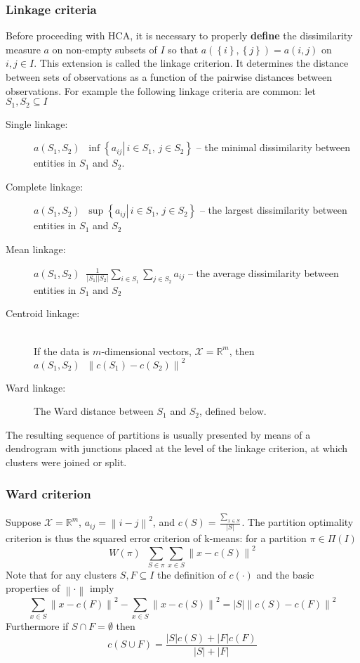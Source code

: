 \documentclass[a4paper]{article}
\newcommand{\obj}[1]{{\left\{ #1 \right \}}}
\newcommand{\brac}[1]{{\left ( #1 \right )}}
\newcommand{\induc}[1]{{\left . #1 \right \vert}}
\newcommand{\abs}[1]{{\left | #1 \right |}}
\newcommand{\nrm}[1]{{\left\| #1 \right \|}}
\newcommand{\Real}{\mathbb{R}}
\newcommand{\defn}{\mathop{\overset{\Delta}{=}}\nolimits}
\begin{document}
\subsubsection*{Linkage criteria} %
\label{ssub:linkage_criteria}

Before proceeding with HCA, it is necessary to properly \textbf{define} the dissimilarity measure $a$ on non-empty subsets of $I$ so that $a\brac{\obj{i}, \obj{j}} = a(i,j)$ on $i,j\in I$. This extension is called the linkage criterion. It determines the distance between sets of observations as a function of the pairwise distances between observations. For example the following linkage criteria are common: let $S_1, S_2\subseteq I$ \begin{description}
	\item[Single linkage:] %
		$a(S_1, S_2) \defn \inf\obj{\induc{ a_{ij} }\, i\in S_1,\,j\in S_2}$ -- the minimal dissimilarity between entities in $S_1$ and $S_2$.
	\item[Complete linkage:] %
		$a(S_1, S_2) \defn \sup\obj{\induc{ a_{ij} }\, i\in S_1,\,j\in S_2}$ -- the largest dissimilarity between entities in $S_1$ and $S_2$
	\item[Mean linkage:] %
	$a(S_1, S_2) \defn \frac{1}{\abs{S_1}\abs{S_2}} \sum_{i\in S_1}\sum_{j\in S_2} a_{ij}$ -- the average dissimilarity between entities in $S_1$ and $S_2$
	\item[Centroid linkage:] \hfill\\
	If the data is $m$-dimensional vectors, $\mathcal{X} = \Real^m$, then $a(S_1,S_2)\defn \nrm{ c(S_1) - c(S_2) }^2$
	\item[Ward linkage:] %
	The Ward distance between $S_1$ and $S_2$, defined below.
\end{description}
The resulting sequence of partitions is usually presented by means of a dendrogram with junctions placed at the level of the linkage criterion, at which clusters were joined or split.


\subsubsection*{Ward criterion} %
\label{ssub:ward_criterion}

Suppose $\mathcal{X} = \Real^m$, $a_{ij} = \nrm{ i - j }^2$, and $c(S) = \frac{\sum_{x\in S}}{\abs{S}}$. The partition optimality criterion is thus the squared error criterion of k-means: for a partition $\pi\in \Pi(I)$ \[W(\pi)\defn \sum_{S\in \pi} \sum_{x\in S} \nrm{x - c(S)}^2\] Note that for any clusters $S,F\subseteq I$ the definition of $c(\cdot)$ and the basic properties of $\nrm{\cdot}$ imply\[ \sum_{x\in S} \nrm{ x - c(F)}^2 - \sum_{x\in S} \nrm{ x - c(S)}^2 = \abs{S} \nrm{ c(S) - c(F)}^2\] Furthermore if $S\cap F =\emptyset$ then \[c\brac{S\cup F} = \frac{\abs{S} c(S) + \abs{F} c(F)}{\abs{S}+\abs{F}}\]
\end{document}
